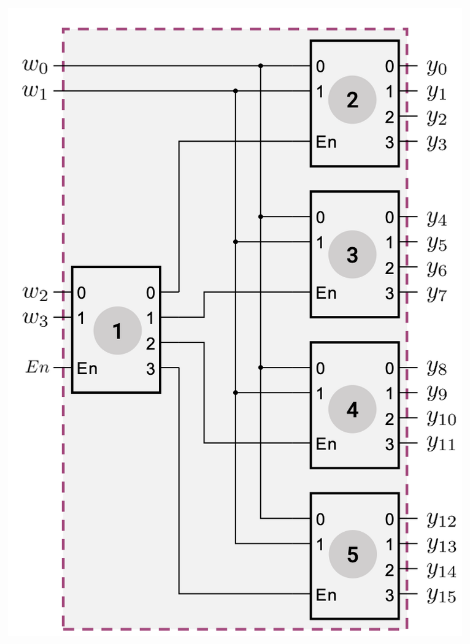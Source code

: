 \documentclass[12pt,openany]{book}
\begin{document}
\begin{minipage}[htp]{0.4\textwidth}
    \begin{center}
        \includegraphics[width=0.9\textwidth]{circuits/16.1_5.png}
    \end{center}
\end{minipage}
\end{document}
